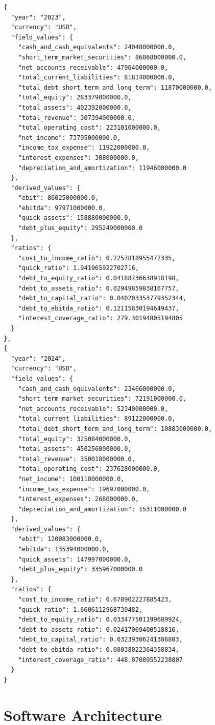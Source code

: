 \documentclass[12pt,a4paper]{article}
\begin{document}
\begin{lstlisting}[style=json, caption={Calculated financial ratios for Google (FY\,2023--2024)}, label=lst:ratios_google]
{
  "year": "2023",
  "currency": "USD",
  "field_values": {
    "cash_and_cash_equivalents": 24048000000.0,
    "short_term_market_securities": 86868000000.0,
    "net_accounts_receivable": 47964000000.0,
    "total_current_liabilities": 81814000000.0,
    "total_debt_short_term_and_long_term": 11870000000.0,
    "total_equity": 283379000000.0,
    "total_assets": 402392000000.0,
    "total_revenue": 307394000000.0,
    "total_operating_cost": 223101000000.0,
    "net_income": 73795000000.0,
    "income_tax_expense": 11922000000.0,
    "interest_expenses": 308000000.0,
    "depreciation_and_amortization": 11946000000.0
  },
  "derived_values": {
    "ebit": 86025000000.0,
    "ebitda": 97971000000.0,
    "quick_assets": 158880000000.0,
    "debt_plus_equity": 295249000000.0
  },
  "ratios": {
    "cost_to_income_ratio": 0.7257818955477335,
    "quick_ratio": 1.941965922702716,
    "debt_to_equity_ratio": 0.04188736638918198,
    "debt_to_assets_ratio": 0.02949859838167757,
    "debt_to_capital_ratio": 0.040203353779352344,
    "debt_to_ebitda_ratio": 0.12115830194649437,
    "interest_coverage_ratio": 279.30194805194805
  }
},
{
  "year": "2024",
  "currency": "USD",
  "field_values": {
    "cash_and_cash_equivalents": 23466000000.0,
    "short_term_market_securities": 72191000000.0,
    "net_accounts_receivable": 52340000000.0,
    "total_current_liabilities": 89122000000.0,
    "total_debt_short_term_and_long_term": 10883000000.0,
    "total_equity": 325084000000.0,
    "total_assets": 450256000000.0,
    "total_revenue": 350018000000.0,
    "total_operating_cost": 237628000000.0,
    "net_income": 100118000000.0,
    "income_tax_expense": 19697000000.0,
    "interest_expenses": 268000000.0,
    "depreciation_and_amortization": 15311000000.0
  },
  "derived_values": {
    "ebit": 120083000000.0,
    "ebitda": 135394000000.0,
    "quick_assets": 147997000000.0,
    "debt_plus_equity": 335967000000.0
  },
  "ratios": {
    "cost_to_income_ratio": 0.678902227885423,
    "quick_ratio": 1.6606112968739482,
    "debt_to_equity_ratio": 0.033477501199689924,
    "debt_to_assets_ratio": 0.02417069400518816,
    "debt_to_capital_ratio": 0.03239306241386803,
    "debt_to_ebitda_ratio": 0.08038022364358834,
    "interest_coverage_ratio": 448.07089552238807
  }
}
\end{lstlisting}

\section{Software Architecture}
\end{document}
